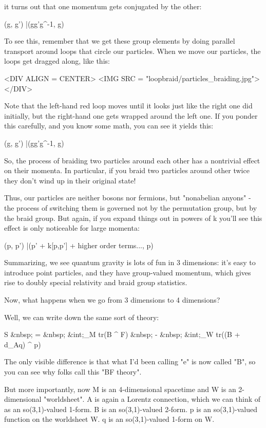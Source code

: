 it turns out that one momentum gets conjugated by the other:

(g, g') |\to  (gg'g^{-1}, g)

To see this, remember that we get these group elements by doing
parallel transport around loops that circle our particles.  When
we move our particles, the loops get dragged along, like this:

<DIV ALIGN = CENTER>
<IMG SRC = "loopbraid/particles_braiding.jpg">
</DIV>

Note that the left-hand red loop moves until it looks just
like the right one did initially, but the right-hand one gets
wrapped around the left one.  If you ponder this carefully, 
and you know some math, you can see it yields this:

(g, g') |\to  (gg'g^{-1}, g)

So, the process of braiding two particles around each other has a
nontrivial effect on their momenta.  In particular, if you braid two
particles around other twice they don't wind up in their original
state!  

Thus, our particles are neither bosons nor fermions, but
"nonabelian anyons" - the process of switching them is
governed not by the permutation group, but by the braid group.  
But again, if you expand things out in powers of k you'll see this 
effect is only noticeable for large momenta:

(p, p') |\to  (p' + k[p,p'] + higher order terms..., p)

Summarizing, we see quantum gravity is lots of fun in 3 dimensions:
it's easy to introduce point particles, and they have group-valued
momentum, which gives rise to doubly special relativity and braid
group statistics.

Now, what happens when we go from 3 dimensions to 4 dimensions?

Well, we can write down the same sort of theory:

S &nbsp; = &nbsp; 
&int;_{M}  tr(B ^ F) &nbsp; - &nbsp;
&int;_{W}  tr((B + d_{A}q) ^ p)

The only visible difference is that what I'd been calling
"e" is now called "B", so you can see why folks
call this "BF theory". 

But more importantly, now M is an 4-dimensional spacetime and W is an 
2-dimensional "worldsheet".  A is again a Lorentz connection, which 
we can think of as an so(3,1)-valued 1-form.   B is an so(3,1)-valued 
2-form.  p is an so(3,1)-valued function on the worldsheet W.  q is an 
so(3,1)-valued 1-form on W.

